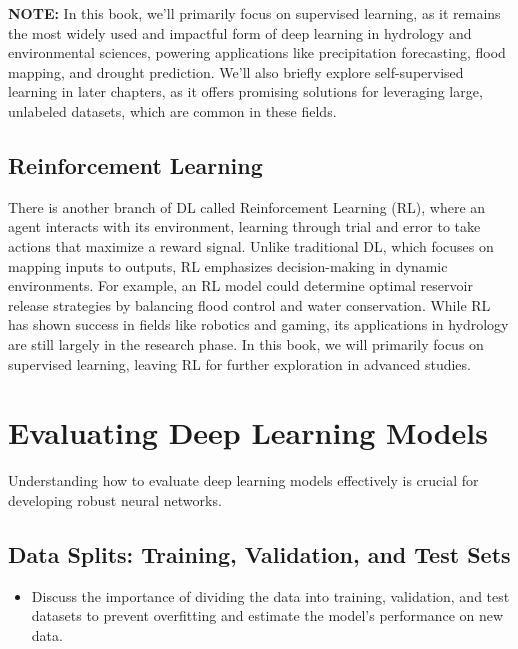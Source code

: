 \textbf{NOTE:} In this book, we’ll primarily focus on supervised learning, as it remains the most widely used and impactful form of deep learning in hydrology and environmental sciences, powering applications like precipitation forecasting, flood mapping, and drought prediction. We’ll also briefly explore self-supervised learning in later chapters, as it offers promising solutions for leveraging large, unlabeled datasets, which are common in these fields.

\subsection{Reinforcement Learning}
There is another branch of DL called Reinforcement Learning (RL), where an agent interacts with its environment, learning through trial and error to take actions that maximize a reward signal. Unlike traditional DL, which focuses on mapping inputs to outputs, RL emphasizes decision-making in dynamic environments. For example, an RL model could determine optimal reservoir release strategies by balancing flood control and water conservation. While RL has shown success in fields like robotics and gaming, its applications in hydrology are still largely in the research phase. In this book, we will primarily focus on supervised learning, leaving RL for further exploration in advanced studies.























\section{Evaluating Deep Learning Models}
Understanding how to evaluate deep learning models effectively is crucial for developing robust neural networks.

\subsection{Data Splits: Training, Validation, and Test Sets}
\begin{itemize}
    \item Discuss the importance of dividing the data into training, validation, and test datasets to prevent overfitting and estimate the model's performance on new data.
\end{itemize}

